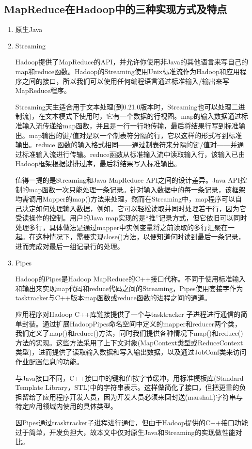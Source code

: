 \subsection{MapReduce在Hadoop中的三种实现方式及特点}
\begin{enumerate}
\item 原生Java



\item Streaming

Hadoop提供了MapReduce的API，并允许你使用非Java的其他语言来写自己的map和reduce函数。Hadoop的Streaming使用Unix标准流作为Hadoop和应用程序之间的接口，所以我们可以使用任何编程语言通过标准输入/输出来写MapReduce程序。

Streaming天生适合用于文本处理(到0.21.0版本时，Streaming也可以处理二进制流)，在文本模式下使用时，它有一个数据的行视图。map的输入数据通过标准输入流传递给map函数，并且是一行一行地传输，最后将结果行写到标准输出。map输出的键/值对是以一个制表符分隔的行，它以这样的形式写到标准输出。reduce 函数的输入格式相同——通过制表符来分隔的键/值对——并通过标准输入流进行传输。reduce函数从标准输入流中读取输入行，该输入已由Hadoop框架根据键排过序，最后将结果写入标准输出。

值得一提的是Streaming和Java MapReduce API之间的设计差异。Java API控制的map函数一次只能处理一条记录。针对输入数据中的每一条记录，该框架均需调用Mapper的map()方法来处理，然而在Streaming中，map程序可以自己决定如何处理输入数据，例如，它可以轻松读取并同时处理若干行，因为它受读操作的控制。用户的Java map实现的是“推”记录方式，但它依旧可以同时处理多行，具体做法是通过mapper中实例变量将之前读取的多行汇聚在一起。在这种情况下，需要实现close()方法，以便知道何时读到最后一条记录，进而完成对最后一组记录行的处理。


\item Pipes

Hadoop的Pipes是Hadoop MapReduce的C++接口代称。不同于使用标准输入和输出来实现map代码和reduce代码之间的Streaming，Pipes使用套接字作为tasktracker与C++版本map函数或reduce函数的进程之间的通道。

应用程序对Hadoop C++库链接提供了一个与tasktracker 子进程进行通信的简单封装。通过扩展HadoopPipes命名空间中定义的mapper和reducer两个类，我们定义了map()和reduce()方法，同时我们提供各种情况下map()和reduce()方法的实现。这些方法采用了上下文对象(MapContext类型或ReduceContext类型)，进而提供了读取输入数据和写入输出数据，以及通过JobConf类来访问作业配置信息的功能。

与Java接口不同，C++接口中的键和值按字节缓冲，用标准模板库(Standard Template Library，STL)中的字符串表示。这样做简化了接口，但把更重的负担留给了应用程序开发人员，因为开发人员必须来回封送(marshall)字符串与特定应用领域内使用的具体类型。

因Pipes通过trasktracker子进程进行通信，但由于Hadoop提供的C++接口功能过于简单，开发负担大，故本文中仅对原生Java和Streaming的实现做性能对比。

\end{enumerate}
